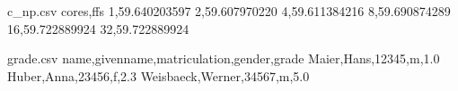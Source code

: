
\begin{filecontents*}{c_np.csv}
cores,ffs
1,59.640203597 
2,59.607970220 
4,59.611384216 
8,59.690874289 
16,59.722889924
32,59.722889924
\end{filecontents*}

\begin{filecontents*}{grade.csv}
name,givenname,matriculation,gender,grade
Maier,Hans,12345,m,1.0
Huber,Anna,23456,f,2.3
Weisbaeck,Werner,34567,m,5.0
\end{filecontents*}
